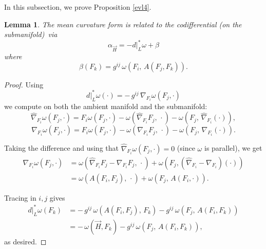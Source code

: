 \documentclass[12pt,letterpaper]{amsart}%
\newcounter{mycounter}
\numberwithin{mycounter}{section}
\theoremstyle{plain}
\newtheorem{lemma}[mycounter]{Lemma}
\numberwithin{equation}{section}
\theoremstyle{definition}
\begin{document}
In this subsection, we prove Proposition \ref{evl4}.
\begin{lemma}
The mean curvature form is related to the codifferential (on the
submanifold)\ via\
\[
\alpha_{\vec{H}}=-d|_{L}^{\ast}\omega+\beta
\]
where
\[
\beta(F_{k}) = g^{ij}\,\omega\!\left(F_{i},\,A\!\left(F_{j},F_{k}\right)\right).
\]

\end{lemma}
\begin{proof}
Using
\[
d|_{L}^{\ast}\omega(\cdot) = -\,g^{ij}\,\nabla_{F_{i}}\omega(F_{j},\cdot)
\]
we compute on both the ambient manifold and the submanifold:
\[
\hat{\nabla}_{F_{i}}\omega(F_{j},\cdot)
= F_{i}\omega(F_{j},\cdot)
  - \omega\!\left(\hat{\nabla}_{F_{i}}F_{j},\,\cdot\right)
  - \omega\!\left(F_{j},\,\hat{\nabla}_{F_{i}}(\cdot)\right),
\]
\[
\nabla_{F_{i}}\omega(F_{j},\cdot)
= F_{i}\omega(F_{j},\cdot)
  - \omega\!\left(\nabla_{F_{i}}F_{j},\,\cdot\right)
  - \omega\!\left(F_{j},\,\nabla_{F_{i}}(\cdot)\right).
\]

Taking the difference and using that 
\(\hat{\nabla}_{F_{i}}\omega(F_{j},\cdot)=0\) (since \(\omega\) is parallel), we get
\begin{align*}
\nabla_{F_{i}}\omega(F_{j},\cdot)
&= \omega\!\left(\hat{\nabla}_{F_{i}}F_{j} - \nabla_{F_{i}}F_{j},\,\cdot\right)
 + \omega\!\left(F_{j},\left(\hat{\nabla}_{F_{i}} - \nabla_{F_{i}}\right)(\cdot)\right) \\
&= \omega\!\left(A(F_{i},F_{j}),\,\cdot\right)
  + \omega\!\left(F_{j},\,A(F_{i},\cdot)\right).
\end{align*}

Tracing in \(i,j\) gives
\begin{align*}
d|_{L}^{\ast}\omega(F_{k})
&= -\,g^{ij}\,\omega\!\left(A(F_{i},F_{j}),\,F_{k}\right)
   - g^{ij}\,\omega\!\left(F_{j},\,A(F_{i},F_{k})\right) \\
&= -\,\omega(\vec{H},F_{k})
   - g^{ij}\,\omega\!\left(F_{j},\,A(F_{i},F_{k})\right),
\end{align*}
as desired.
\end{proof}

\end{document}
